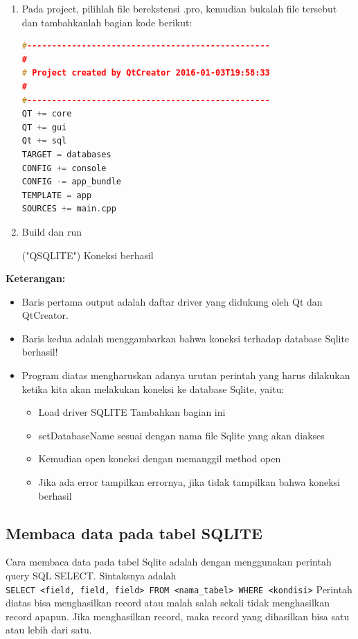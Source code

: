 \begin{enumerate}
\item
Pada project, pilihlah file berekstensi .pro, kemudian bukalah file
tersebut dan tambahkanlah bagian kode berikut:

\begin{lstlisting}[language=c++]
#-------------------------------------------------
#
# Project created by QtCreator 2016-01-03T19:58:33
#
#-------------------------------------------------
QT += core
QT += gui
Qt += sql
TARGET = databases
CONFIG += console
CONFIG -= app_bundle
TEMPLATE = app
SOURCES += main.cpp
\end{lstlisting}

\item
Build dan run

\begin{lcverbatim}
("QSQLITE")
Koneksi berhasil
\end{lcverbatim}
\end{enumerate}

\textbf{Keterangan:}

\begin{itemize}

\item
Baris pertama output adalah daftar driver yang didukung oleh Qt dan
QtCreator.
\item
Baris kedua adalah menggambarkan bahwa koneksi terhadap database
Sqlite berhasil!
\item
Program diatas mengharuskan adanya urutan perintah yang harus
dilakukan ketika kita akan melakukan koneksi ke database Sqlite,
yaitu: 

\begin{itemize}
\item Load driver SQLITE Tambahkan bagian ini
\item setDatabaseName sesuai dengan nama file Sqlite yang akan diakses 
\item Kemudian open koneksi dengan memanggil method open 
\item Jika ada error tampilkan errornya, jika tidak tampilkan bahwa koneksi berhasil
\end{itemize}

\end{itemize}

\subsection{Membaca data pada tabel SQLITE}

Cara membaca data pada tabel Sqlite adalah dengan menggunakan perintah
query SQL SELECT. Sintaksnya adalah
\texttt{SELECT\ \textless{}field,\ field,\ field\textgreater{}\ FROM\ \textless{}nama\_tabel\textgreater{}\ WHERE\ \textless{}kondisi\textgreater{}}
Perintah diatas bisa menghasilkan record atau malah salah sekali tidak
menghasilkan record apapun. Jika menghasilkan record, maka record yang
dihasilkan bisa satu atau lebih dari satu.

